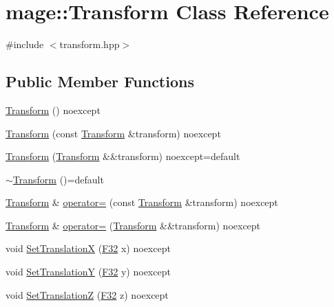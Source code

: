 \hypertarget{classmage_1_1_transform}{}\section{mage\+:\+:Transform Class Reference}
\label{classmage_1_1_transform}


{\ttfamily \#include $<$transform.\+hpp$>$}

\subsection*{Public Member Functions}
\begin{DoxyCompactItemize}
\item 
\hyperlink{classmage_1_1_transform_a0fe54a3ac740025755d567a423c39de0}{Transform} () noexcept
\item 
\hyperlink{classmage_1_1_transform_aa26f3bb808d660ff5fccf594c0958386}{Transform} (const \hyperlink{classmage_1_1_transform}{Transform} \&transform) noexcept
\item 
\hyperlink{classmage_1_1_transform_a0d1081071df89ee1ec2640774107f66c}{Transform} (\hyperlink{classmage_1_1_transform}{Transform} \&\&transform) noexcept=default
\item 
\hyperlink{classmage_1_1_transform_a2da8c6542920e0748a504c32c54073f6}{$\sim$\+Transform} ()=default
\item 
\hyperlink{classmage_1_1_transform}{Transform} \& \hyperlink{classmage_1_1_transform_a5541fef38c72592a32c06fcbb2199d8d}{operator=} (const \hyperlink{classmage_1_1_transform}{Transform} \&transform) noexcept
\item 
\hyperlink{classmage_1_1_transform}{Transform} \& \hyperlink{classmage_1_1_transform_a7ed96cf9bc81595035537139c118efce}{operator=} (\hyperlink{classmage_1_1_transform}{Transform} \&\&transform) noexcept
\item 
void \hyperlink{classmage_1_1_transform_a99a7e4aaba6cee799bb014d9a1b5e227}{Set\+TranslationX} (\hyperlink{namespacemage_aa97e833b45f06d60a0a9c4fc22ae02c0}{F32} x) noexcept
\item 
void \hyperlink{classmage_1_1_transform_ae33a9ea844cac0bdb303e4e347e576c3}{Set\+TranslationY} (\hyperlink{namespacemage_aa97e833b45f06d60a0a9c4fc22ae02c0}{F32} y) noexcept
\item 
void \hyperlink{classmage_1_1_transform_a71009b20361c01c0ffbd981986d323e8}{Set\+TranslationZ} (\hyperlink{namespacemage_aa97e833b45f06d60a0a9c4fc22ae02c0}{F32} z) noexcept
\item 

\end{DoxyCompactItemize}
